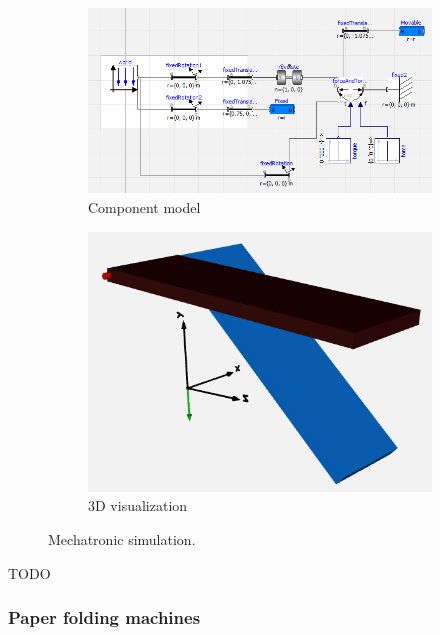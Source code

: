 \documentclass{PDS}
\begin{document}
\begin{figure}[htbp]
    \begin{subfigure}[b]{0.56\textwidth}
        \includegraphics[width=\textwidth]{./figures/glasshouse_mechatronic_1.png}
        \caption{Component model}
        \label{fig:glasshouse-sim-1}
    \end{subfigure}
    \hfill
    \begin{subfigure}[b]{0.4\textwidth}
        \includegraphics[width=\textwidth]{./figures/glasshouse_mechatronic_2.png}
        \caption{3D visualization}
        \label{fig:glasshouse-sim-2}
    \end{subfigure}
    \caption{Mechatronic simulation.}
    \label{fig:glasshouse-sim}
\end{figure}

TODO

\subsubsection{Paper folding machines}
\label{sec:master-system-lego}
\end{document}
